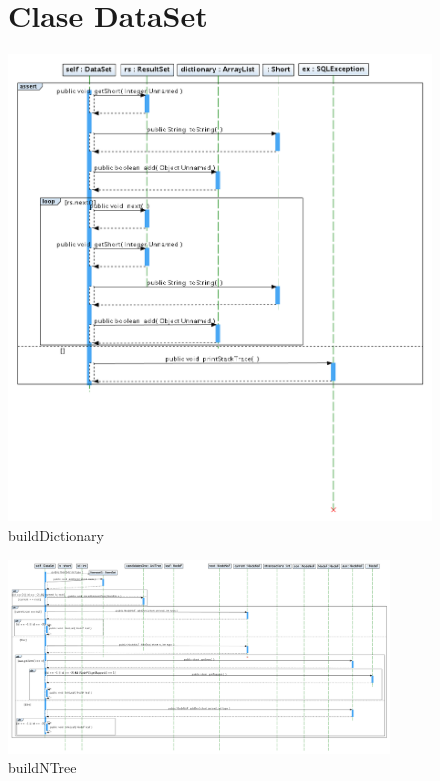 \begin{figure}
\section{Clase DataSet}
\includegraphics[width=1.2\textwidth]{DataSet/buildDictionary.png}
\caption{buildDictionary}
\end{figure}
\newpage
\begin{figure}
\centering
\includegraphics[angle=90, width=0.9\textwidth]{DataSet/buildNTree.png}
\caption{buildNTree}
\end{figure}

